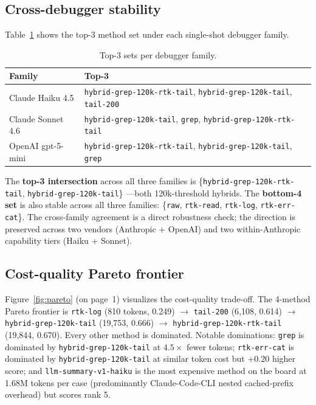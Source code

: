 \documentclass{article}
\begin{document}
\subsection{Cross-debugger stability}

Table~\ref{tab:topthree} shows the top-3 method set under each
single-shot debugger family.

\begin{table}[h]
\centering
\small
\caption{Top-3 sets per debugger family.}
\label{tab:topthree}
\begin{tabular}{ll}
\toprule
\textbf{Family} & \textbf{Top-3} \\
\midrule
Claude Haiku 4.5  & \texttt{hybrid-grep-120k-rtk-tail}, \texttt{hybrid-grep-120k-tail}, \texttt{tail-200} \\
Claude Sonnet 4.6 & \texttt{hybrid-grep-120k-tail}, \texttt{grep}, \texttt{hybrid-grep-120k-rtk-tail} \\
OpenAI gpt-5-mini & \texttt{hybrid-grep-120k-rtk-tail}, \texttt{hybrid-grep-120k-tail}, \texttt{grep} \\
\bottomrule
\end{tabular}
\end{table}

The \textbf{top-3 intersection} across all three families is
\{\texttt{hybrid-grep-120k-rtk-tail}, \texttt{hybrid-grep-120k-tail}\}
---both 120k-threshold hybrids. The \textbf{bottom-4 set} is also
stable across all three families: \{\texttt{raw}, \texttt{rtk-read},
\texttt{rtk-log}, \texttt{rtk-err-cat}\}. The cross-family agreement
is a direct robustness check; the direction is preserved across two
vendors (Anthropic + OpenAI) and two within-Anthropic capability
tiers (Haiku + Sonnet).

\subsection{Cost-quality Pareto frontier}
\label{sec:pareto}

Figure~\ref{fig:pareto} (on page~1) visualizes the cost-quality
trade-off. The 4-method Pareto frontier is
\texttt{rtk-log} (810 tokens, 0.249) $\to$
\texttt{tail-200} (6{,}108, 0.614) $\to$
\texttt{hybrid-grep-120k-tail} (19{,}753, 0.666) $\to$
\texttt{hybrid-grep-120k-rtk-tail} (19{,}844, 0.670). Every other
method is dominated. Notable dominations:
\texttt{grep} is dominated by \texttt{hybrid-grep-120k-tail} at
$4.5\times$ fewer tokens; \texttt{rtk-err-cat} is dominated by
\texttt{hybrid-grep-120k-tail} at similar token cost but $+0.20$
higher score; and \texttt{llm-summary-v1-haiku} is the most
expensive method on the board at 1.68M tokens per case
(predominantly Claude-Code-CLI nested cached-prefix overhead) but
scores rank 5.
\end{document}

